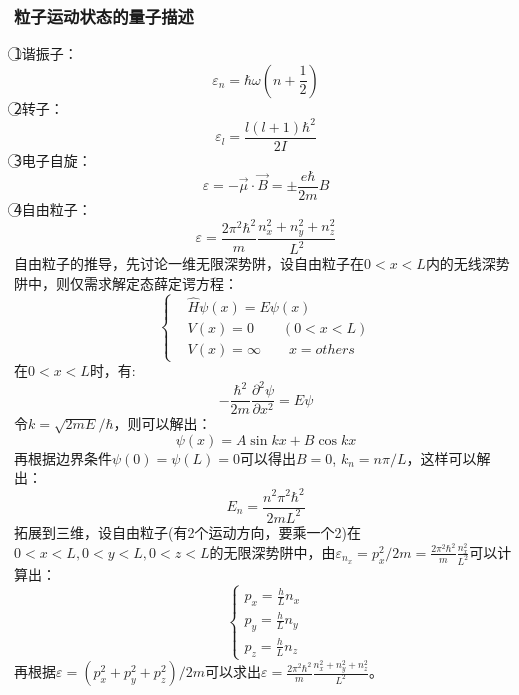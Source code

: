 \documentclass[12pt]{article}
\begin{document}
\subsubsection{粒子运动状态的量子描述}
\noindent
\textcircled{1}谐振子：
\begin{equation}
	\varepsilon_n=\hbar \omega(n+\frac{1}{2})
	\label{x42}
\end{equation}
\textcircled{2}转子：
\begin{equation}
	\varepsilon_l=\frac{l(l+1)\hbar^2}{2I}
\end{equation}
\textcircled{3}电子自旋：
\begin{equation}
	\varepsilon =-\vec{\mu }\cdot \vec{B}=\pm \frac{e \hbar}{2m}B
\end{equation}
\textcircled{4}自由粒子：
\begin{equation}
	\varepsilon=\frac{2\pi^2\hbar^2}{m}\frac{n_x^2+n_y^2+n_z^2}{L^2}
\end{equation}
自由粒子的推导，先讨论一维无限深势阱，设自由粒子在$0<x<L$内的无线深势阱中，则仅需求解定态薛定谔方程：
\begin{equation}
	\left \{
	\begin{split}
		&\hat{H}\psi(x)=E\psi(x)\\
		&V(x)=0\quad \quad (0<x<L)\\
		&V(x)=\infty \quad\quad x=others
	\end{split}\right.
\end{equation}
在$0<x<L$时，有:
\begin{equation}
	-\frac{\hbar^2}{2m}\frac{\partial^2 \psi}{\partial x^2}=E\psi
\end{equation}
令$k=\sqrt{2mE}/\hbar$，则可以解出：
\begin{equation}
	\psi(x)=A\sin kx+B\cos kx
\end{equation}
再根据边界条件$\psi(0)=\psi(L)=0$可以得出$B=0$, $k_n=n\pi/L$，这样可以解出：
\begin{equation}
	E_n=\frac{n^2\pi^2\hbar^2}{2mL^2}
\end{equation}
拓展到三维，设自由粒子(有2个运动方向，要乘一个2)在$0<x<L,0<y<L,0<z<L$的无限深势阱中，由$\varepsilon_{n_x}=p_x^2/2m=\frac{2\pi^2\hbar^2}{m}\frac{n_x^2}{L^2}$可以计算出：
\begin{equation}
	\left\{\begin{split}
		p_x=\frac{h}{L}n_x\\
		p_y=\frac{h}{L}n_y\\
		p_z=\frac{h}{L}n_z
	\end{split}\right.
\end{equation}
再根据$\varepsilon=(p_x^2+p_y^2+p_z^2)/2m$可以求出$\varepsilon=\frac{2\pi^2\hbar^2}{m}\frac{n_x^2+n_y^2+n_z^2}{L^2}$。
\end{document}
